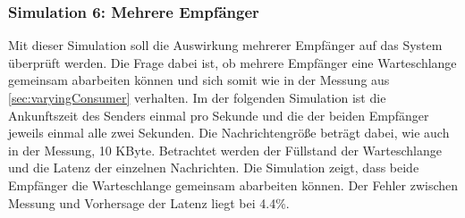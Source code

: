 \subsubsection{Simulation 6: Mehrere Empfänger}
Mit dieser Simulation soll die Auswirkung mehrerer Empfänger auf das System überprüft werden. Die Frage dabei ist, ob mehrere Empfänger eine Warteschlange gemeinsam abarbeiten können und sich somit wie in der Messung aus \autoref{sec:varyingConsumer} verhalten. Im der folgenden Simulation ist die Ankunftszeit des Senders einmal pro Sekunde und die der beiden Empfänger jeweils einmal alle zwei Sekunden. Die Nachrichtengröße beträgt dabei, wie auch in der Messung, 10 KByte. Betrachtet werden der Füllstand der Warteschlange und die Latenz der einzelnen Nachrichten. 
Die Simulation zeigt, dass beide Empfänger die Warteschlange gemeinsam abarbeiten können. Der Fehler zwischen Messung und Vorhersage der Latenz liegt bei 4.4\%. 







